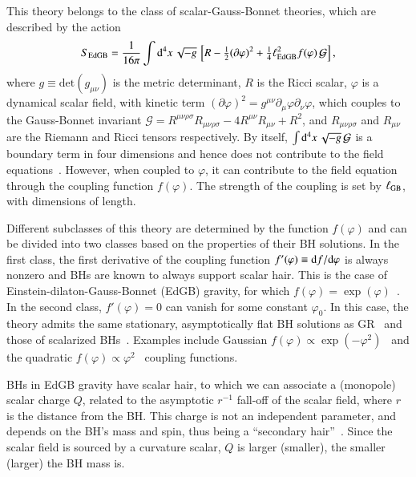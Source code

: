 \documentclass[twocolumn,
               prd,
               aps,
               superscriptaddress,
               tightenlines,
               nofootinbib,
               eqsecnum,
               amsfonts,
               amsmath,
               longbibliography]{revtex4-1}
\newcommand{\dd}{{\rm d}}
\newcommand{\dV}{{\rm d}^{4}x \, \sqrt{-g} \,}
\begin{document}
This theory belongs to the class of scalar-Gauss-Bonnet theories, which are
described by the action
%
\begin{align} \label{eq:action_sgb}
    S_{\rm EdGB} = \frac{1}{16 \pi}
    \int \dV
    \left[
    R - \tfrac{1}{2}(\partial \varphi)^2
    + \tfrac{1}{4} \ell^{2}_{\rm EdGB} f(\varphi) \, \mathcal{G}
    \right],
    \nonumber \\
\end{align}
%
where $g \equiv \textrm{det}(g_{\mu \nu})$ is the metric determinant, $R$ is the Ricci
scalar, $\varphi$ is a dynamical scalar field, with kinetic term $(\partial \varphi)^2 = g^{\mu\nu} \partial_{\mu} \varphi \partial_{\nu} \varphi$,
which couples to the Gauss-Bonnet invariant
%
$\mathcal{G} =
R^{\mu\nu\rho\sigma}R_{\mu\nu\rho\sigma}
- 4 R^{\mu\nu}R_{\mu\nu}
+ R^2$,
%
and $R_{\mu\nu\rho\sigma}$ and $R_{\mu\nu}$ are the Riemann and Ricci tensors respectively.
%
By itself, $\int \dV \mathcal{G}$ is a boundary term in four dimensions
and hence does not contribute to the field equations~\cite{Myers:1987yn}.
%
However,  when coupled to $\varphi$, it can contribute to the field equation
through the coupling function $f(\varphi)$. The strength of the coupling is
set by $\ell_{\rm GB}$, with dimensions of length.

Different subclasses of this theory are determined by the function $f(\varphi)$
and can be divided into two classes based on the properties of their BH
solutions.
%
In the first class, the first derivative of the coupling function $f'(\varphi)
\equiv \dd f  / \dd \varphi$ is always nonzero and BHs are known to always
support scalar hair.
%
This is the case of Einstein-dilaton-Gauss-Bonnet (EdGB) gravity, for which
$f(\varphi) = \exp(\varphi)$~\cite{Kanti:1995vq}.
%
In the second class, $f'(\varphi) = 0$ can vanish for some constant $\varphi_0$.
%
In this case, the theory admits the same stationary, asymptotically flat BH
solutions as GR~\cite{Silva:2017uqg} and those of scalarized
BHs~\cite{Doneva:2017bvd,Silva:2017uqg,Macedo:2019sem,Dima:2020yac,Herdeiro:2020wei,Berti:2020kgk}.
%
Examples include Gaussian $f(\varphi) \propto \exp(-\varphi^2)$~\cite{Doneva:2017bvd} and
the quadratic $f(\varphi) \propto \varphi^2$~\cite{Silva:2017uqg} coupling functions.

BHs in EdGB gravity have scalar hair, to which we can associate a (monopole) scalar charge $Q$,
related to the asymptotic $r^{-1}$ fall-off of the scalar field, where $r$ is the distance from the BH.
%
This charge is not an independent parameter, and depends on the BH's mass and spin,
thus being a ``secondary hair''~\cite{Coleman:1991ku,Kanti:1995vq,Herdeiro:2015waa}.
%
Since the scalar field is sourced by a curvature scalar, $Q$ is larger (smaller),
the smaller (larger) the BH mass is.
\end{document}
